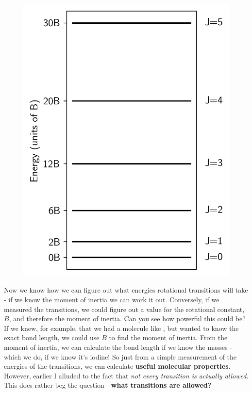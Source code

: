 \documentclass{memoir}[11pt,oneside,a4paper,openany]
\begin{document}
\begin{figure}
	\centering
	\includegraphics[width=\linewidth]{rotational_energy_levels}
\end{figure}
Now we know how we can figure out what energies rotational transitions will take - if we know the moment of inertia we can work it out. Conversely, if we measured the transitions, we could figure out a value for the rotational constant, $B$, and therefore the moment of inertia. Can you see how powerful this could be? If we knew, for example, that we had a molecule like , but wanted to know the exact bond length, we could use $B$ to find the moment of inertia. From the moment of inertia, we can calculate the bond length if we know the masses - which we do, if we know it's iodine! So just from a simple measurement of the energies of the transitions, we can calculate \textbf{useful molecular properties}. However, earlier I alluded to the fact that \emph{not every transition is actually allowed}. This does rather beg the question - \textbf{what transitions are allowed?}
\end{document}

